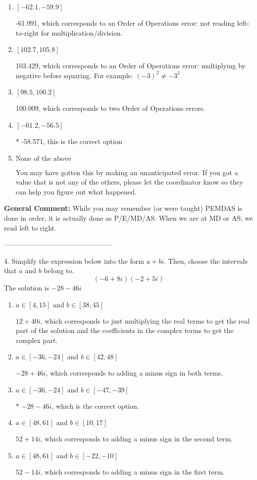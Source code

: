 \documentclass{extbook}[14pt]
\begin{document}
\begin{enumerate}[label=\Alph*.] 
\item $ [-62.1, -59.9] $ 

  -61.991, which corresponds to an Order of Operations error: not reading left-to-right for multiplication/division. 
\item $ [102.7, 105.8] $ 

  103.429, which corresponds to an Order of Operations error: multiplying by negative before squaring. For example: $(-3)^2 \neq -3^2$ 
\item $ [98.5, 100.2] $ 

  100.009, which corresponds to two Order of Operations errors. 
\item $ [-61.2, -56.5] $ 

 * -58.571, this is the correct option 
\item $ \text{None of the above} $ 

  You may have gotten this by making an unanticipated error. If you got a value that is not any of the others, please let the coordinator know so they can help you figure out what happened. 
\end{enumerate} 
 
\textbf{General Comment:} While you may remember (or were taught) PEMDAS is done in order, it is actually done as P/E/MD/AS. When we are at MD or AS, we read left to right. 

-----------------------------------------------

4. Simplify the expression below into the form $a+bi$. Then, choose the intervals that $a$ and $b$ belong to.
\[ (-6 + 8 i)(-2 + 5 i) \] 
The solution is $ -28 - 46 i $ 

\begin{enumerate}[label=\Alph*.] 
\item $ a \in [4, 15] \text{ and } b \in [38, 45] $ 

  $12 + 40 i$, which corresponds to just multiplying the real terms to get the real part of the solution and the coefficients in the complex terms to get the complex part. 
\item $ a \in [-36, -24] \text{ and } b \in [42, 48] $ 

  $-28 + 46 i$, which corresponds to adding a minus sign in both terms. 
\item $ a \in [-36, -24] \text{ and } b \in [-47, -39] $ 

 * $-28 - 46 i$, which is the correct option. 
\item $ a \in [48, 61] \text{ and } b \in [10, 17] $ 

  $52 + 14 i$, which corresponds to adding a minus sign in the second term. 
\item $ a \in [48, 61] \text{ and } b \in [-22, -10] $ 

  $52 - 14 i$, which corresponds to adding a minus sign in the first term. 
\end{enumerate} 
 
\end{document}
